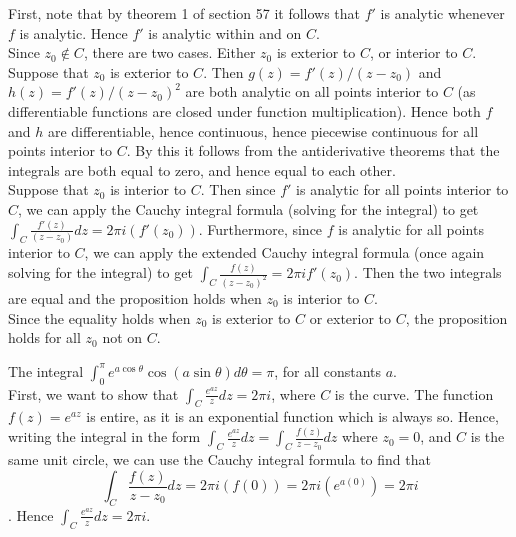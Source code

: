 \documentclass{article}
\theoremstyle{definition}
\newcommand{\cs}[1]{\color{blue}{#1}\normalcolor}
\begin{document}
 First, note that by theorem 1 of section 57 it follows that $f'$ is analytic whenever $f$ is analytic. Hence $f'$ is analytic within and on $C$.\\

Since $z_0\not\in C$, there are two cases. Either $z_0$ is exterior to $C$, or interior to $C$.\\

Suppose that $z_0$ is exterior to $C$. Then $g(z) = f'(z)/(z-z_0)$ and $h(z) = f'(z)/(z-z_0)^2$ are both analytic on all points interior to $C$ (as differentiable functions are closed under function multiplication). Hence both $f$ and $h$ are differentiable, hence continuous, hence piecewise continuous for all points interior to $C$. \cs{That last sentence is unnecessary -- analyticity is what you need. The piecewise continuous refers to the curve, not the function.} By this it follows from the antiderivative theorems that the integrals are both equal to zero, and hence equal to each other.\\

Suppose that $z_0$ is interior to $C$. Then since $f'$ is analytic for all points interior to $C$, we can apply the Cauchy integral formula (solving for the integral) to get $\int_C\frac{f'(z)}{(z-z_0)}dz = 2\pi i (f'(z_0))$. Furthermore, since $f$ is analytic for all points interior to $C$, we can apply the extended Cauchy integral formula (once again solving for the integral) to get 
$\int_C\frac{f(z)}{(z-z_0)^2} = 2\pi i f'(z_0)$. Then the two integrals are equal and the proposition holds when $z_0$ is interior to $C$.\\

Since the equality holds when $z_0$ is exterior to $C$ or exterior to $C$, the proposition holds for all $z_0$ not on $C$.\\

\cs{5/5}


 The integral $\int_{0}^\pi e^{a\cos\theta}\cos(a\sin\theta)d\theta = \pi$, for all constants $a$.\\

 First, we want to show that $\int_C\frac{e^{az}}{z}dz = 2\pi i$, where $C$ is the curve. The function $f(z) = e^{az}$ is entire, as it is an exponential function which is always so. Hence, writing the integral in the form $\int_C\frac{e^{az}}{z}dz = \int_C\frac{f(z)}{z-z_0}dz$ where $z_0 = 0$, and $C$ is the same unit circle, we can use the Cauchy integral formula to find that $$\int_C\frac{f(z)}{z-z_0}dz = 2\pi i(f(0)) = 2\pi i(e^{a(0)}) = 2\pi i$$. Hence $\int_C\frac{e^{az}}{z}dz = 2\pi i$. \\
\end{document}
